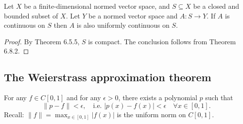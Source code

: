 \begin{corollary}
Let \( X \) be a finite-dimensional normed vector space, and \( S \subseteq X \) be a closed and bounded subset of \( X \). Let \( Y \) be a normed vector space and \( A: S \to Y \). If \( A \) is continuous on \( S \) then \( A \) is also uniformly continuous on \( S \).
\end{corollary}

\begin{proof}
By Theorem 6.5.5, \( S \) is compact. The conclusion follows from Theorem 6.8.2.
\end{proof}

\subsection{The Weierstrass approximation theorem}

\begin{theorem}
For any $f \in C[0,1]$ and for any $\epsilon > 0$, there exists a polynomial $p$ such that
\[
\|p - f\| < \epsilon, \quad \text{i.e. } |p(x) - f(x)| < \epsilon \quad \forall x \in [0,1].
\]
Recall: $\|f\| = \max_{x \in [0,1]} |f(x)|$ is the uniform norm on $C[0,1]$.
\end{theorem}

